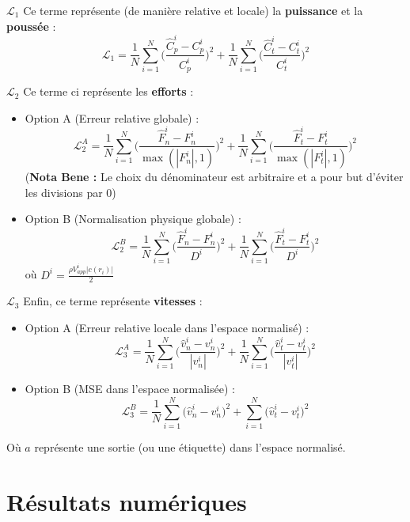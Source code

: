 \documentclass[
11pt,notheorems,hyperref={pdfauthor=whatever}
]{beamer}
\begin{document}
\begin{frame}{$\mathcal{L}_1$}
    Ce terme représente (de manière relative et locale) la \textbf{puissance} et la \textbf{poussée} : 
    \[
    \mathcal{L}_1 = \frac{1}{N}\sum_{i=1}^N \Big(\frac{\hat{C}_{p}^i - C_p^i}{C_p^i}\Big)^2 + \frac{1}{N}\sum_{i=1}^N \Big(\frac{\hat{C}_{t}^i - C_t^i}{C_t^i}\Big)^2
    \]

\end{frame}

\begin{frame}{$\mathcal{L}_2$}
    Ce terme ci représente les \textbf{efforts} : 
    \begin{itemize}
        \item Option A (Erreur relative globale) : \[
            \mathcal{L}_2^A =  \frac{1}{N}\sum_{i=1}^N \Big(\frac{\hat{F}_{n}^i - F_n^i}{\max(| F_n^i |, 1)}\Big)^2 + \frac{1}{N}\sum_{i=1}^N  \Big(\frac{\hat{F}_{t}^i - F_t^i}{\max(|F_t^i|,1)}\Big)^2
        \]
        (\textbf{Nota Bene : } Le choix du dénominateur est arbitraire et a pour but d'éviter les divisions par 0)
        \item Option B (Normalisation physique globale) : \[
            \mathcal{L}_2^B =  \frac{1}{N}\sum_{i=1}^N \Big(\frac{\hat{F}_{n}^i - F_n^i}{ D^i }\Big)^2 + \frac{1}{N}\sum_{i=1}^N  \Big(\frac{\hat{F}_{t}^i - F_t^i}{D^i}\Big)^2
        \]
        où $D^i = \frac{\rho V_{app}^i |c(r_i)|}{2}$
    \end{itemize}
\end{frame}

\begin{frame}{$\mathcal{L}_3$}
    Enfin, ce terme représente \textbf{vitesses} :
    \begin{itemize}
        \item Option A (Erreur relative locale dans l'espace normalisé) :\[
            \mathcal{L}_3^A =  \frac{1}{N}\sum_{i=1}^N \Big(\frac{\hat{v}_{n}^i - v_n^i}{| v_n^i |}\Big)^2 + \frac{1}{N}\sum_{i=1}^N  \Big(\frac{\hat{v}_{t}^i - v_t^i}{|v_t^i|}\Big)^2
        \]
        \item Option B (MSE dans l'espace normalisée) :\[
            \mathcal{L}_3^B = \frac{1}{N}\sum_{i=1}^N  \Big( \hat{v}_{n}^i - v_n^i \Big)^2 + \sum_{i=1}^N  \Big( \hat{v}_{t}^i - v_t^i \Big)^2
        \]
    \end{itemize}
    Où $a$ représente une sortie (ou une étiquette) dans l'espace normalisé.
\end{frame}

\section{Résultats numériques}
\end{document}
